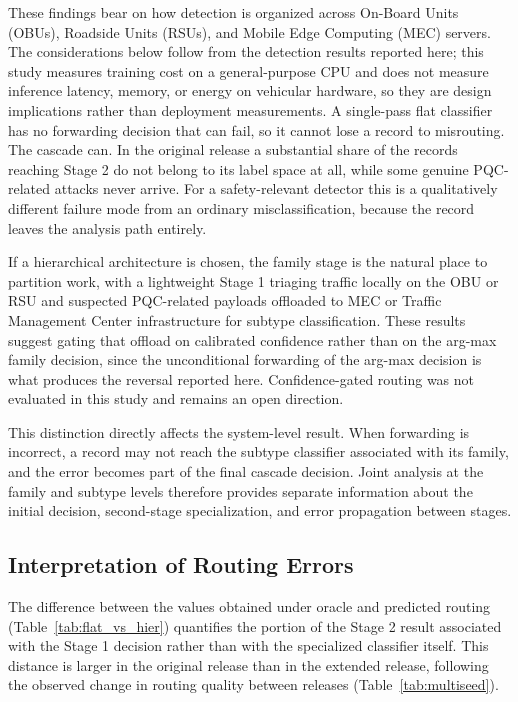 \documentclass{IEEEoj}
\begin{document}
These findings bear on how detection is organized across On-Board Units (OBUs), Roadside Units (RSUs), and Mobile Edge Computing (MEC) servers. The considerations below follow from the detection results reported here; this study measures training cost on a general-purpose CPU and does not measure inference latency, memory, or energy on vehicular hardware, so they are design implications rather than deployment measurements.
A single-pass flat classifier has no forwarding decision that can fail, so it cannot lose a record to misrouting. The cascade can. In the original release a substantial share of the records reaching Stage 2 do not belong to its label space at all, while some genuine PQC-related attacks never arrive. For a safety-relevant detector this is a qualitatively different failure mode from an ordinary misclassification, because the record leaves the analysis path entirely.

If a hierarchical architecture is chosen, the family stage is the natural place to partition work, with a lightweight Stage 1 triaging traffic locally on the OBU or RSU and suspected PQC-related payloads offloaded to MEC or Traffic Management Center infrastructure for subtype classification. These results suggest gating that offload on calibrated confidence rather than on the arg-max family decision, since the unconditional forwarding of the arg-max decision is what produces the reversal reported here. Confidence-gated routing was not evaluated in this study and remains an open direction.

This distinction directly affects the system-level result. When forwarding is incorrect, a record may not reach the subtype classifier associated with its family, and the error becomes part of the final cascade decision. Joint analysis at the family and subtype levels therefore provides separate information about the initial decision, second-stage specialization, and error propagation between stages.

\subsection{Interpretation of Routing Errors}
The difference between the values obtained under oracle and predicted routing (Table~\ref{tab:flat_vs_hier}) quantifies the portion of the Stage 2 result associated with the Stage 1 decision rather than with the specialized classifier itself. This distance is larger in the original release than in the extended release, following the observed change in routing quality between releases (Table~\ref{tab:multiseed}).
\end{document}
